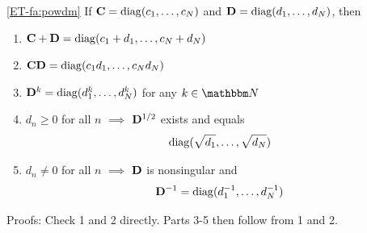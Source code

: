 \begin{frame}
    
    \vspace{2em}
    \Fact\eqref{ET-fa:powdm} If $\mathbf C = \operatorname{diag}(c_1, \ldots, c_N)$ and $\mathbf D = \operatorname{diag}(d_1, \ldots,
    d_N)$, then
    \begin{enumerate}
        \item $\mathbf C + \mathbf D = \operatorname{diag}(c_1 + d_1, \ldots, c_N + d_N)$
            \vspace{0.4em}
        \item $\mathbf C \mathbf D = \operatorname{diag}(c_1 d_1, \ldots, c_N d_N)$
            \vspace{0.4em}
        \item $\mathbf D^k = \operatorname{diag}(d^k_1, \ldots, d^k_N)$ for any $k \in \NN$
            \vspace{0.4em}
        \item $d_n \geq 0$ for all $n$ $\implies$ $\mathbf D^{1/2}$ exists and equals
            $$\operatorname{diag}(\sqrt{d_1}, \ldots, \sqrt{d_N})$$
            \vspace{-1.5em}
        \item $d_n \not= 0$ for all $n$ $\implies$ $\mathbf D$ is nonsingular and 
            $$\mathbf D^{-1} = \operatorname{diag}(d_1^{-1}, \ldots, d_N^{-1})$$
    \end{enumerate}

    \vspace{1em}

    Proofs: Check 1 and 2 directly. Parts 3-5 then follow from 1 and 2. 

\end{frame}


